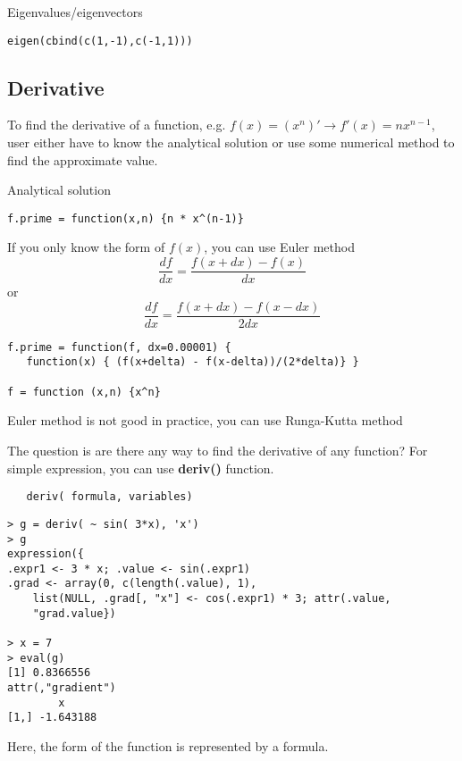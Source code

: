 \textbullet Eigenvalues/eigenvectors
\begin{lstlisting}
eigen(cbind(c(1,-1),c(-1,1))) 
\end{lstlisting}

\subsection{Derivative}
\label{sec:derivative}


To find the derivative of a function, e.g. $f(x) = (x^n)' \rightarrow
f'(x)= nx^{n-1}$, user either have to know the analytical solution or
use some numerical method to find the approximate value.

Analytical solution
\begin{lstlisting}
f.prime = function(x,n) {n * x^(n-1)}
\end{lstlisting}

If you only know the form of $f(x)$, you can use Euler method
\begin{equation}
  \label{eq:19}
  \frac{df}{dx} = \frac{f(x+dx)-f(x)}{dx}
\end{equation}
or
\begin{equation}
  \label{eq:20}
   \frac{df}{dx} = \frac{f(x+dx)-f(x-dx)}{2dx}
\end{equation}
\begin{lstlisting}
f.prime = function(f, dx=0.00001) { 
   function(x) { (f(x+delta) - f(x-delta))/(2*delta)} }

f = function (x,n) {x^n}
\end{lstlisting}

Euler method is not good in practice, you can use Runga-Kutta method

The question is are there any way to find the derivative of any
function? For simple expression, you can use {\bf deriv()} function.
\begin{verbatim}
   deriv( formula, variables)
\end{verbatim}

\begin{lstlisting}
> g = deriv( ~ sin( 3*x), 'x')
> g
expression({
.expr1 <- 3 * x; .value <- sin(.expr1)
.grad <- array(0, c(length(.value), 1), 
    list(NULL, .grad[, "x"] <- cos(.expr1) * 3; attr(.value,
    "grad.value})  

> x = 7
> eval(g)
[1] 0.8366556
attr(,"gradient")
        x
[1,] -1.643188
\end{lstlisting}
Here, the form of the function is represented by a formula.

